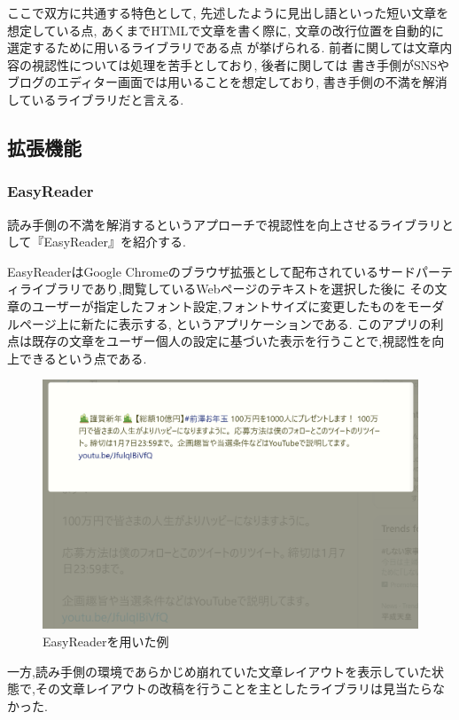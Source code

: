 ここで双方に共通する特色として, 先述したように見出し語といった短い文章を想定している点, 
あくまでHTMLで文章を書く際に, 文章の改行位置を自動的に選定するために用いるライブラリである点
が挙げられる.
前者に関しては文章内容の視認性については処理を苦手としており, 後者に関しては
書き手側がSNSやブログのエディター画面では用いることを想定しており, 
書き手側の不満を解消しているライブラリだと言える.

\subsection{拡張機能}

\subsubsection{EasyReader}
読み手側の不満を解消するというアプローチで視認性を向上させるライブラリとして『EasyReader』\footnotemark[4]
を紹介する.


EasyReaderはGoogle Chromeのブラウザ拡張として配布されているサードパーティライブラリであり,閲覧しているWebページのテキストを選択した後に
その文章のユーザーが指定したフォント設定,フォントサイズに変更したものをモーダルページ上に新たに表示する, というアプリケーションである.
このアプリの利点は既存の文章をユーザー個人の設定に基づいた表示を行うことで,視認性を向上できるという点である.

\begin{figure}[H]
    \centering
    \label{fig:image_5}
    \includegraphics[width=0.6\columnwidth]{image/02/img_5.png}
    \caption[EasyReaderを用いた例]{EasyReaderを用いた例}
\end{figure}

一方,読み手側の環境であらかじめ崩れていた文章レイアウトを表示していた状態で,その文章レイアウトの改稿を行うことを主としたライブラリは見当たらなかった.

